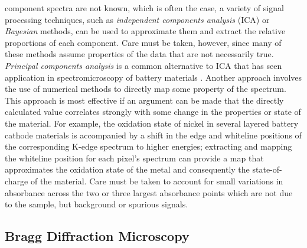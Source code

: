\documentclass[journal=cmatex,manuscript=perspective]{achemso}
\begin{document}
component spectra are not known, which is often the case, a variety of
signal processing techniques, such as \emph{independent components
  analysis} (ICA)\cite{shlens2014} or \emph{Bayesian}
  methods\cite{knuth2005}, can be used to approximate them and
extract the relative proportions of each
component\cite{bioucas2012,duarte2014}. Care must be taken, however,
since many of these methods assume properties of the data that are not
necessarily true. \emph{Principal components analysis} is a common
alternative to ICA that has seen application in spectromicroscopy of
battery materials \cite{shapiro2014,boesenberg2013}. Another approach
involves the use of numerical methods to directly map some property of
the spectrum. This approach is most effective if an argument can be
made that the directly calculated value correlates strongly with some
change in the properties or state of the material. For example, the
oxidation state of nickel in several layered battery cathode materials
is accompanied by a shift in the edge and whiteline positions of the
corresponding K-edge spectrum to higher energies\cite{deb2006};
extracting and mapping the whiteline position for each pixel's
spectrum can provide a map that approximates the oxidation state of
the metal and consequently the state-of-charge of the material. Care
must be taken to account for small variations in absorbance across the
two or three largest absorbance points which are not due to the
sample, but background or spurious signals.

\subsection{Bragg Diffraction Microscopy}
\end{document}
